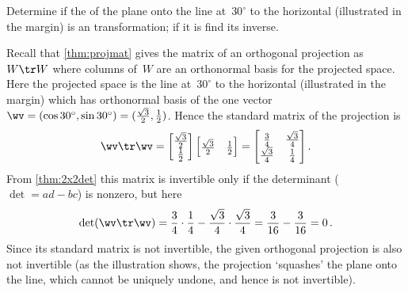 \begin{example} 
Determine if the  of the plane onto the line at~\(30^\circ\) to the horizontal (illustrated in the margin) is an  transformation; if it is find its inverse.
%
\begin{solution} 
Recall that \cref{thm:projmat} gives the matrix of an orthogonal projection as~\(W\tr W\) where columns of~\(W\) are an orthonormal basis for the projected space.
Here the projected space is the line at~\(30^\circ\) to the horizontal (illustrated in the margin) which has orthonormal basis of the one vector \(\wv=(\cos 30^\circ,\sin 30^\circ)=(\tfrac{\sqrt3}2,\tfrac12)\).
Hence the standard matrix of the projection is
\begin{equation*}
\wv\tr\wv=\begin{bmatrix} \tfrac{\sqrt3}2\\\tfrac12 \end{bmatrix}
\begin{bmatrix} \tfrac{\sqrt3}2&\tfrac12 \end{bmatrix}
=\begin{bmatrix} \tfrac34&\tfrac{\sqrt3}4\\
\tfrac{\sqrt3}4&\tfrac14 \end{bmatrix}.
\end{equation*}
From \cref{thm:2x2det} this matrix is invertible only if the determinant (\(\det=ad-bc\)) is nonzero, but here
\begin{equation*}
\det(\wv\tr\wv)=\frac34\cdot\frac14-\frac{\sqrt3}4\cdot\frac{\sqrt3}4
=\frac3{16}-\frac3{16}=0\,.
\end{equation*}
Since its standard matrix is not invertible, the given orthogonal projection is also not invertible (as the illustration shows, the projection `squashes' the plane onto the line, which cannot be uniquely undone, and hence is not invertible).
\end{solution}
\end{example}







%



